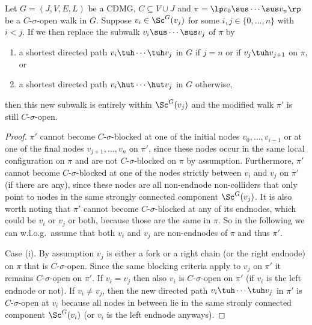 \begin{Lem}\label{lem:replace_walk}
Let $G=(J,V,E,L)$ be a CDMG, $C \subseteq V \cup J$ and $\pi = \lp  v_0 \sus \cdots \sus v_n \rp$ be a $C$-$\sigma$-open walk in $G$. 
  Suppose $v_i \in \Sc^G(v_j)$ for some $i,j \in \{0,\dots,n\}$ with $i < j$.
If we then replace the subwalk $v_i \sus \cdots \sus v_j$ of $\pi$ by 
  \begin{enumerate}[label=(\roman*)]
      \item a shortest directed path $v_i \tuh \cdots \tuh v_j$ in $G$ if $j = n$ or if $v_j \tuh v_{j+1}$ on $\pi$, or 
    \item a shortest directed path $v_i \hut \cdots \hut v_j$ in $G$ otherwise,
  \end{enumerate}
  then this new subwalk is entirely within $\Sc^G(v_j)$ and the modified walk $\pi'$ is still $C$-$\sigma$-open.
\begin{proof}
$\pi'$ cannot become $C$-$\sigma$-blocked at one of the initial nodes $v_0, \dots, v_{i-1}$ or at one of the final nodes $v_{j+1}, \dots, v_n$ on $\pi'$, since these nodes occur in the same local configuration on $\pi$ and are not $C$-$\sigma$-blocked on $\pi$ by assumption.
Furthermore, $\pi'$ cannot become $C$-$\sigma$-blocked at one of the nodes strictly between $v_i$ and $v_j$ on $\pi'$ (if there are any), since these nodes are all non-endnode non-colliders that only point to nodes in the same strongly connected component $\Sc^G(v_j)$. It is also worth noting that $\pi'$ cannot become $C$-$\sigma$-blocked at any of its endnodes, which could be $v_i$ or $v_j$ or both, because those are the same in $\pi$. So in the following we can w.l.o.g.\ assume that both $v_i$ and $v_j$ are non-endnodes of $\pi$ and thus $\pi'$.

Case (i). By assumption $v_j$ is either a fork or a right chain (or the right endnode) on $\pi$ that is $C$-$\sigma$-open. Since the same blocking criteria apply to $v_j$ on $\pi'$ it remains $C$-$\sigma$-open on $\pi'$. If $v_i=v_j$ then also $v_i$ is $C$-$\sigma$-open on $\pi'$ (if $v_i$ is the left endnode or not). If $v_i \neq v_j$, then the new directed path $v_i \tuh \cdots \tuh v_j$ in $\pi'$ is $C$-$\sigma$-open at $v_i$ because all nodes in between lie in the same stronly connected component $\Sc^G(v_i)$ (or $v_i$ is the left endnode anyways).


\end{proof}
\end{Lem}
